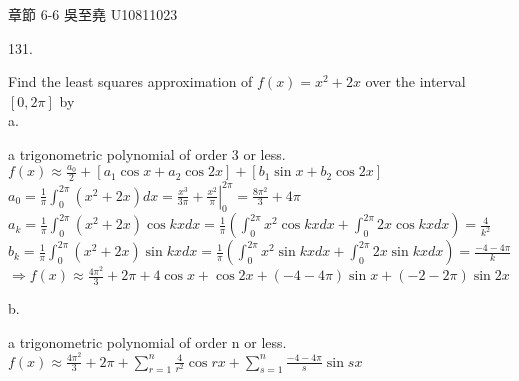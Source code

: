 \documentclass[12pt]{book}
\author{andersonwu2000}
\begin{document}
\begin{CJK}{UTF8}{bsmi}

\hfill 章節 6-6 吳至堯 U10811023


131. \begin{minipage}[t]{\dimexpr\linewidth}
Find the least squares approximation of $f(x)=x^2+2x$ over the interval $[0,2\pi]$ by \\
a. \begin{minipage}[t]{\dimexpr\linewidth}
a trigonometric polynomial of order 3 or less. \\
$\displaystyle f(x)\approx\frac{a_0}{2}+[a_1\cos x+a_2\cos2x]+[b_1\sin x+b_2\cos 2x]$ \\
$\displaystyle a_0=\frac{1}{\pi}\int_0^{2\pi}(x^2+2x)dx =
\left.\frac{x^3}{3\pi}+\frac{x^2}{\pi}\right|^{2\pi}_0 =
\frac{8\pi^2}{3}+4\pi$ \\
$\displaystyle a_k=\frac{1}{\pi}\int_0^{2\pi}(x^2+2x)\cos kxdx =
\frac{1}{\pi}\left(\int_0^{2\pi}x^2\cos kxdx+\int_0^{2\pi}2x\cos kxdx\right) = \frac{4}{k^2}$ \\
$\displaystyle b_k=\frac{1}{\pi}\int_0^{2\pi}(x^2+2x)\sin kxdx =
\frac{1}{\pi}\left(\int_0^{2\pi}x^2\sin kxdx+\int_0^{2\pi}2x\sin kxdx\right) = \frac{-4-4\pi}{k}$ \\
$\displaystyle\Rightarrow f(x)\approx\frac{4\pi^2}{3}+2\pi+4\cos x+\cos2x+(-4-4\pi)\sin x+(-2-2\pi)\sin2x$ \\
\end{minipage}
b. \begin{minipage}[t]{\dimexpr\linewidth}
a trigonometric polynomial of order n or less. \\
$\displaystyle f(x)\approx\frac{4\pi^2}{3}+2\pi+\sum_{r=1}^n\frac{4}{r^2}\cos rx+\sum_{s=1}^n\frac{-4-4\pi}{s}\sin sx$ \\
\end{minipage}
\end{minipage}\\


\end{CJK}
\end{document}
